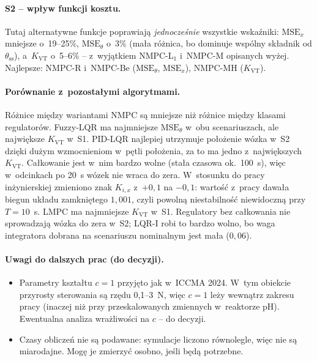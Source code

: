 \paragraph{S2 -- wpływ funkcji kosztu.} Tutaj alternatywne funkcje poprawiają
\emph{jednocześnie} wszystkie wskaźniki: $\mathrm{MSE}_x$ mniejsze o~19--25\%,
$\mathrm{MSE}_\theta$ o~3\% (mała różnica, bo dominuje wspólny składnik od $\theta_\mathrm{ss}$),
a~$K_\mathrm{VT}$ o~5--6\% -- z~wyjątkiem NMPC-L$_1$ i~NMPC-M opisanych wyżej. Najlepsze:
NMPC-R i~NMPC-Be ($\mathrm{MSE}_\theta$, $\mathrm{MSE}_x$), NMPC-MH ($K_\mathrm{VT}$).

\paragraph{Porównanie z~pozostałymi algorytmami.} Różnice między wariantami NMPC są
mniejsze niż różnice między klasami regulatorów. Fuzzy-LQR ma najmniejsze
$\mathrm{MSE}_\theta$ w~obu scenariuszach, ale największe $K_\mathrm{VT}$ w~S1. PID-LQR
najlepiej utrzymuje położenie wózka w~S2 dzięki dużym wzmocnieniom w~pętli położenia, za to ma
jedno z~największych $K_\mathrm{VT}$. Całkowanie jest w~nim bardzo wolne (stała czasowa
ok.~100~s), więc w~odcinkach po 20~s wózek nie wraca do zera. W~stosunku do pracy inżynierskiej
zmieniono znak $K_{i,x}$ z~$+0{,}1$ na $-0{,}1$: wartość z~pracy dawała biegun układu zamkniętego
$1{,}001$, czyli powolną niestabilność niewidoczną przy $T=10$~s. LMPC ma najmniejsze
$K_\mathrm{VT}$ w~S1. Regulatory bez całkowania nie sprowadzają wózka do zera w~S2; LQR-I robi to
bardzo wolno, bo waga integratora dobrana na scenariuszu nominalnym jest mała ($0{,}06$).

\paragraph{Uwagi do dalszych prac (do decyzji).}
\begin{itemize}
\item Parametry kształtu $c=1$ przyjęto jak w~ICCMA 2024. W~tym obiekcie przyrosty sterowania
są rzędu 0,1--3~N, więc $c=1$ leży wewnątrz zakresu pracy (inaczej niż przy
przeskalowanych zmiennych w~reaktorze pH). Ewentualna analiza wrażliwości na $c$ -- do decyzji.
\item Czasy obliczeń nie są podawane: symulacje liczono równolegle, więc nie są miarodajne.
Mogę je zmierzyć osobno, jeśli będą potrzebne.
\end{itemize}
